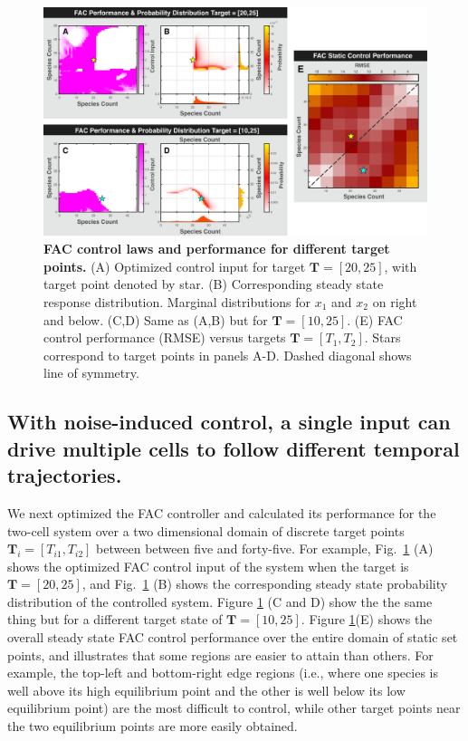 \documentclass[12pt]{iopart}
\begin{document}
\begin{figure}
\begin{center}
\includegraphics[width=1\textwidth]{StaticControl.pdf}
\vspace{-0.1in}
\caption{{\bf FAC control laws and performance for different target points.} 
(A) Optimized control input for target $\mathbf{T} = [20,25]$, with target point denoted by star. 
(B) Corresponding steady state response distribution. Marginal distributions for $x_1$ and $x_2$  on right and below.
(C,D) Same as (A,B) but for $\mathbf{T} = [10,25]$.
 (E) FAC control performance (RMSE) versus targets $\mathbf{T} = [T_1,T_2]$.  Stars correspond to target points in panels A-D. Dashed diagonal shows line of symmetry.} 
\label{CtrlP}
\end{center}
\vspace{-0.2in}
\end{figure}

\subsection{With noise-induced control, a single input can drive multiple cells to follow different temporal trajectories.}\label{sec:ResTraj}

We next optimized the FAC controller and calculated its performance for the two-cell system over a two dimensional domain of discrete target points $\mathbf{T}_i = [T_{i1},T_{i2}]$ between between five and forty-five. For example, Fig.\ \ref{CtrlP} (A) shows the optimized FAC control input of the system when the target is $\mathbf{T}=[20,25]$, and Fig.\ \ref{CtrlP} (B) shows the corresponding steady state probability distribution of the controlled system. Figure \ref{CtrlP} (C and D) show the the same thing but for a different target state of $\mathbf{T}=[10, 25]$.
Figure \ref{CtrlP}(E) shows the overall steady state FAC control performance over the entire domain of static set points, and illustrates that some regions are easier to attain than others. For example, the top-left and bottom-right edge regions (i.e., where one species is well above its high equilibrium point and the other is well below its low equilibrium point) are the most difficult to control, while other target points near the two equilibrium points are more easily obtained.
\end{document}

